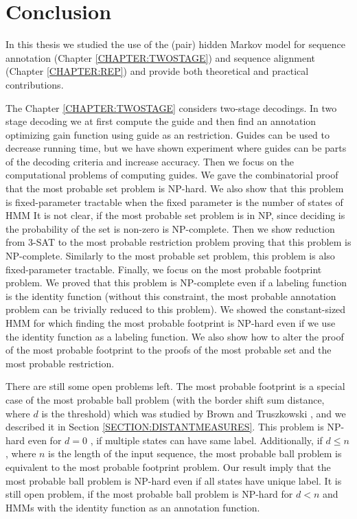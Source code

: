 \chapter{Conclusion}

In this thesis we studied the use of the (pair) hidden Markov model for
sequence annotation (Chapter \ref{CHAPTER:TWOSTAGE}) and sequence alignment
(Chapter \ref{CHAPTER:REP}) and provide both theoretical and practical
contributions.

The Chapter \ref{CHAPTER:TWOSTAGE} considers two-stage decodings. In two stage
decoding we at first compute the guide and then find an annotation optimizing
gain function using guide as an restriction. Guides can be used to decrease
running time, but we have shown experiment where guides can be parts of the
decoding criteria and increase accuracy. Then we focus on the computational problems of computing guides.
We gave the combinatorial proof that the most probable set problem is NP-hard.
We also show that this problem is fixed-parameter tractable when the fixed
parameter is the number of states of HMM It is not clear, if the most probable
set problem is in NP, since deciding is the probability of the set is non-zero
is NP-complete. Then we show reduction from 3-SAT to the most probable
restriction problem proving that this problem is NP-complete. Similarly to the
most probable set problem, this problem is also fixed-parameter tractable.
Finally, we focus on the most probable footprint problem. We proved that this
problem is NP-complete even if a labeling function is the identity function
(without this constraint, the most probable annotation problem can be trivially
reduced to this problem). We showed the constant-sized HMM for which finding
the most probable footprint is NP-hard even if we use the identity function as
a labeling function. We also show how to alter the proof of the most probable
footprint to the proofs of the most probable set and the most probable
restriction. 

There are still some open problems left. The most probable footprint is a
special case of the most probable ball problem (with the border shift sum
distance, where $d$ is the threshold) which was studied by Brown and
Truszkowski \cite{Brown2010}, and we described it in Section
\ref{SECTION:DISTANTMEASURES}.  This problem is NP-hard even for $d=0$
\cite{Brown2010}, if multiple states can have same label. Additionally, if
$d\leq n$, where $n$ is the length of the input sequence, the most probable
ball problem is equivalent to the most probable footprint problem. Our result
imply that the most probable ball problem is NP-hard even if all states have
unique label. It is still open problem, if the most probable ball problem is
NP-hard for $d<n$ and HMMs with the identity function as an annotation
function. 

